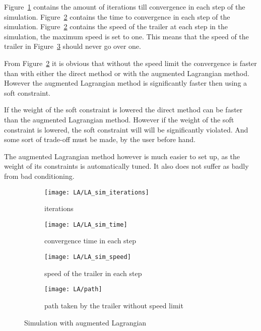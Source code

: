 Figure~\ref{fig:LA iterations} contains the amount of iterations till convergence in each step of the simulation. Figure~\ref{fig:LA time} contains the time to convergence in each step of the simulation. Figure~\ref{fig:LA time} contains the speed of the trailer at each step in the simulation, the maximum speed is set to one. This means that the speed of the trailer in Figure~\ref{fig:LA speed} should never go over one.

From Figure~\ref{fig:LA time} it is obvious that without the speed limit the convergence is faster than with either the direct method or with the augmented Lagrangian method. However the augmented Lagrangian method is significantly faster then using a soft constraint.

If the weight of the soft constraint is lowered the direct method can be faster than the augmented Lagrangian method. However if the weight of the soft constraint is lowered, the soft constraint will will be significantly violated. And some sort of trade-off must be made, by the user before hand.

The augmented Lagrangian method however is much easier to set up, as the weight of its constraints is automatically tuned. It also does not suffer as badly from bad conditioning.

\begin{figure}[H]
	\centering
	\begin{subfigure}[b]{0.45\textwidth}
		\centering
		\texttt{[image: LA/LA\_sim\_iterations]}
		\caption{iterations}
		\label{fig:LA iterations}
	\end{subfigure}
	\hfill
	\begin{subfigure}[b]{0.45\textwidth}
		\centering
		\texttt{[image: LA/LA\_sim\_time]}
		\caption{convergence time in each step}
		\label{fig:LA time}
	\end{subfigure}
	\begin{subfigure}[b]{0.45\textwidth}
		\centering
		\texttt{[image: LA/LA\_sim\_speed]}
		\caption{speed of the trailer in each step}
		\label{fig:LA speed}
	\end{subfigure}
	\hfill
	\begin{subfigure}[b]{0.45\textwidth}
		\centering
		\texttt{[image: LA/path]}
		\caption{path taken by the trailer without speed limit}
		\label{fig:LA path}
	\end{subfigure}
	\caption{Simulation with augmented Lagrangian}
	\label{fig:simulation with augmented Lagrangian}
\end{figure}